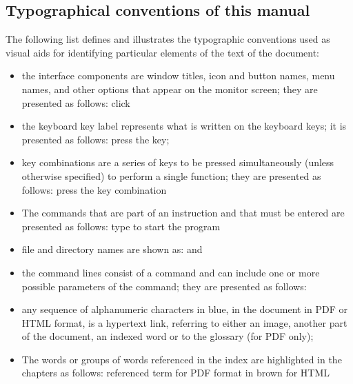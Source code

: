 \subsection{Typographical conventions of this manual \label{introduction-manual-conventions}}

The following list defines and illustrates the typographic conventions used as visual aids for identifying particular elements of the text of the document:

\begin{itemize}
	\item the interface components are window titles, icon and button names, menu names, and other options that appear on the monitor screen; they are presented as follows:
		\newline
		\hspace*{1.5cm} click 
	\item the keyboard key label represents what is written on the keyboard keys; it is presented as follows:
		\newline
		\hspace*{1.5cm} press the  key;
	\item key combinations are a series of keys to be pressed simultaneously (unless otherwise specified) to perform a single function; they are presented as follows:
		\newline
		\hspace*{1.5cm} press the key combination  
	\item The commands that are part of an instruction and that must be entered are presented as follows:
		\newline
		\hspace*{1.5cm} type  to start the program
	\item file and directory names are shown as:
		\newline
		\hspace*{1.5cm}  and 
	\item the command lines consist of a command and can include one or more possible parameters of the command; they are presented as follows:
		\newline
		\hspace*{1.5cm} 
	\item any sequence of alphanumeric characters in blue, in the document in PDF or HTML format, is a hypertext link, referring to either an image, another part of the document, an indexed word or to the glossary (for PDF only);
	\item The words or groups of words referenced in the index are highlighted in the chapters as follows:
		\newline
		\hspace*{1.5cm}
		\textopenbullet{} \textsf{referenced term} for \gls{PDF} format
		\newline
		\hspace*{1.5cm} 
		\textopenbullet{} in brown for \gls{HTML}
\end{itemize}

